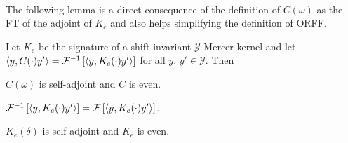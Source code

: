 \paragraph{}
The following lemma is a direct consequence of the definition of $C(\omega)$ as the \acl{FT} of the adjoint of $K_e$ and also helps simplifying the definition of \acs{ORFF}.
\begin{lemma}
\label{lm:C_characterization}
Let $K_e$ be the signature of a shift-invariant $\mathcal{Y}$-Mercer kernel and let $\langle y, C(\cdot)y'\rangle=\mathcal{F}^{-1}\left[\langle y, K_e(\cdot)y'\rangle\right]$ for all $y$. $y'\in\mathcal{Y}$. Then 
\begin{propenum}
\item \label{lm:C_characterization_1} $C(\omega)$ is self-adjoint and $C$ is even.
\item \label{lm:C_characterization_2} $\mathcal{F}^{-1}\left[\langle y, K_e(\cdot)y'\rangle\right] = \mathcal{F}\left[\langle y, K_e(\cdot)y'\rangle\right]$.
\item \label{lm:C_characterization_3} $K_e(\delta)$ is self-adjoint and $K_e$ is even.
\end{propenum}
\end{lemma}
